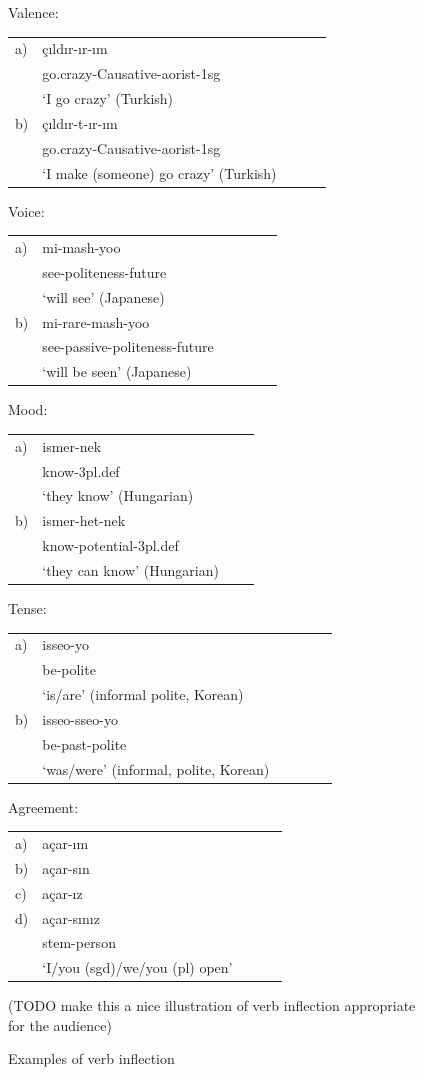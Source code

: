 \documentclass[11pt,letterpaper]{article}
\newcommand\mhahn[1]{{\color{red}(#1)}}
\begin{document}
 
 \begin{figure}[]
     Valence:
\begin{tabular}{lllll}
a) & çıldır-ır-ım \\
& go.crazy-Causative-aorist-1sg \\
& `I go crazy' (Turkish)\\
b) & çıldır-t-ır-ım \\
& go.crazy-Causative-aorist-1sg \\
& `I make (someone) go crazy' (Turkish) \\
\end{tabular}     
Voice:
\begin{tabular}{llllll}
a) & mi-mash-yoo \\
& see-politeness-future \\
& `will see' (Japanese) \\
b) & mi-rare-mash-yoo \\
& see-passive-politeness-future \\
&`will be seen' (Japanese)
\end{tabular}

Mood:
\begin{tabular}{llll}
a) & ismer-nek \\
& know-3pl.def \\
& `they know' (Hungarian) \\
b) & ismer-het-nek \\
& know-potential-3pl.def \\
& `they can know' (Hungarian)
\end{tabular}
Tense:
\begin{tabular}{llllll}
a) & isseo-yo \\ %
& be-polite \\
& `is/are' (informal polite, Korean) \\ 
b) & isseo-sseo-yo \\
 & be-past-polite \\
 & `was/were' (informal, polite, Korean)
 \end{tabular}
 Agreement:
\begin{tabular}{lllll}
a) & açar-ım \\
b)& açar-sın \\
c) & açar-ız \\
d) &açar-sınız \\
& stem-person \\
& `I/you (sgd)/we/you (pl) open'
\end{tabular}

\mhahn{TODO make this a nice illustration of verb inflection appropriate for the audience}

\caption{Examples of verb inflection}
     \label{tab:examples-verbs}
 \end{figure}
 
\end{document}
